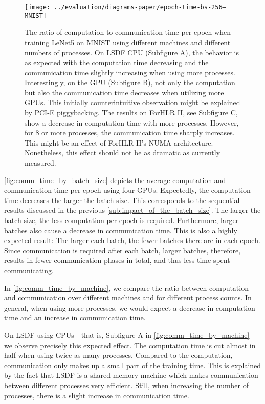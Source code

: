 \documentclass[conference]{IEEEtran}
\begin{document}
\begin{figure*}[!t]
  \normalsize
  \centering
  \texttt{[image: ../evaluation/diagrams-paper/epoch-time-bs-256--MNIST]}
  \caption{The ratio of computation to communication time per epoch when training LeNet5 on MNIST using different machines and different numbers of processes.
  On LSDF CPU (Subfigure A), the behavior is as expected with the computation time decreasing and the communication time slightly increasing when using more processes.
  Interestingly, on the GPU (Subfigure B), not only the computation but also the communication time decreases when utilizing more GPUs.
  This initially counterintuitive observation might be explained by PCI-E piggybacking.
  The results on ForHLR II, see Subfigure C, show a decrease in computation time with more processes.
  However, for 8 or more processes, the communication time sharply increases.
  This might be an effect of ForHLR II's NUMA architecture.
  Nonetheless, this effect should not be as dramatic as currently measured.
  }
  \label{fig:comm_time_by_machine}
  \vspace*{4pt}
  \hrulefill
\end{figure*}

\autoref{fig:comm_time_by_batch_size} depicts the average computation and communication time per epoch using four GPUs.
Expectedly, the computation time decreases the larger the batch size.
This corresponds to the sequential results discussed in the previous \autoref{sub:impact_of_the_batch_size}.
The larger the batch size, the less computation per epoch is required.
%
Furthermore, larger batches also cause a decrease in communication time.
This is also a highly expected result:
The larger each batch, the fewer batches there are in each epoch.
Since communication is required after each batch, larger batches, therefore, results in fewer communication phases in total, and thus less time spent communicating.


In \autoref{fig:comm_time_by_machine}, we compare the ratio between computation and communication over different machines and for different process counts.
In general, when using more processes, we would expect a decrease in computation time and an increase in communication time.

On LSDF using CPUs---that is, Subfigure A in \autoref{fig:comm_time_by_machine}---we observe precisely this expected effect.
The computation time is cut almost in half when using twice as many processes.
Compared to the computation, communication only makes up a small part of the training time.
This is explained by the fact that LSDF is a shared-memory machine which makes communication between different processes very efficient.
Still, when increasing the number of processes, there is a slight increase in communication time.
\end{document}
